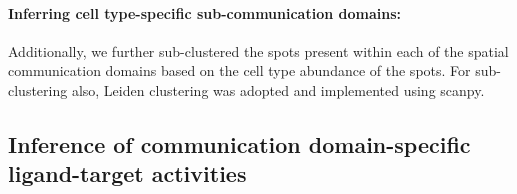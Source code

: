 

\paragraph{Inferring cell type-specific sub-communication domains:} Additionally, we further sub-clustered the spots present within each of the spatial communication domains based on the cell type abundance of the spots. For sub-clustering also, Leiden clustering was adopted and implemented using scanpy.

\subsection*{Inference of communication domain-specific ligand-target activities}

